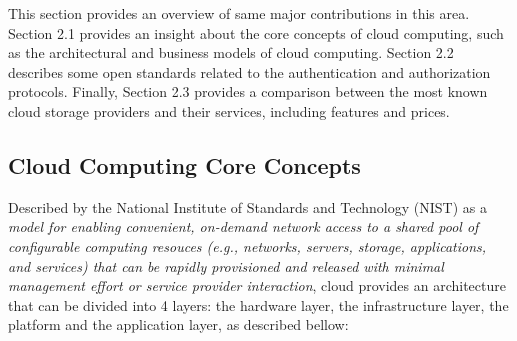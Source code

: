 


This section provides an overview of same major contributions in this area. Section 2.1 provides an insight about the core concepts of cloud computing, such as the architectural and business models of cloud computing. Section 2.2 describes some open standards related to the authentication and authorization protocols. Finally, Section 2.3 provides a comparison between the most known cloud storage providers and their services, including features and prices.
\subsection{Cloud Computing Core Concepts}\label{ssec:tools}

Described by the National Institute of Standards and Technology (NIST) as a {\it model for enabling convenient, on-demand network access to a shared pool of configurable computing resouces (e.g., networks, servers, storage, applications, and services) that can be rapidly provisioned and released with minimal management effort or service provider interaction}, \cite{Zhang2010}
cloud provides an architecture that can be divided into 4 layers: the hardware layer, the infrastructure layer, the platform and the application layer, as described bellow:

